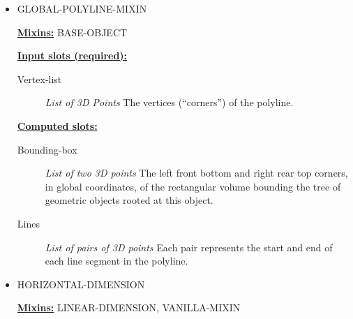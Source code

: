 \documentclass [11pt]{book}
\begin{document}
\begin{itemize}
\begin{figure}
\label{fig:GLOBAL-POLYLINE}

\end{figure}






\item {}GLOBAL-POLYLINE-MIXIN


\textbf{
\underline{Mixins:}} BASE-OBJECT





\begin{description}

\end{description}








\textbf{
\underline{Input slots (required):}}

\begin{description}

\item [Vertex-list]
\emph{List of 3D Points} The vertices (``corners'') of the polyline.


\end{description}






\textbf{
\underline{Computed slots:}}

\begin{description}

\item [Bounding-box]
\emph{List of two 3D points} The left front bottom and right rear top corners, in global coordinates,
of the rectangular volume bounding the tree of geometric objects rooted at this object.


\item [Lines]
\emph{List of pairs of 3D points} Each pair represents the start and end of each line segment in the polyline.


\end{description}







\item {}HORIZONTAL-DIMENSION


\textbf{
\underline{Mixins:}} LINEAR-DIMENSION, VANILLA-MIXIN






\end{itemize}
\end{document}
